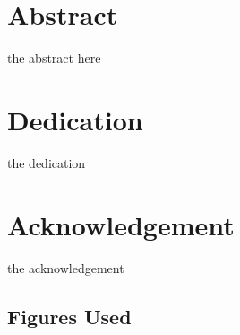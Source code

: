 \documentclass[a4paper,oneside]{report}
\begin{document}
	\chapter*{Abstract}
	the abstract here 
	
	\chapter*{Dedication}
	the dedication
	
	\chapter*{Acknowledgement}
	the acknowledgement
	
	\tableofcontents
	\listoffigures
	\listoftables
	\clearpage
	
	
	
	
	
	
	
	\section*{Figures Used}
	
	
	\newpage
	
\end{document}
